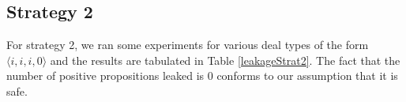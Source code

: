 %
%
%
%
%
%

\subsection{Strategy 2}

For strategy 2, we ran some experiments for various deal
types of the form $\langle i,i,i,0\rangle$ and the results
are tabulated in Table \ref{leakageStrat2}. The fact that the
number of positive propositions leaked is $0$ conforms to our
assumption that it is safe.

